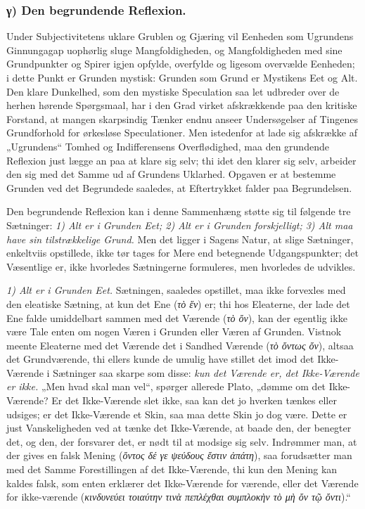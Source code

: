\documentclass[11pt]{book}
\newcommand{\opage}[1]{\marginnote{\footnotesize\textit{[#1]}}}
\begin{document}
\subsubsection*{γ) Den begrundende Reflexion.}

Under Subjectivitetens uklare Grublen og Gjæring vil
Eenheden som Ugrundens Ginnungagap uophørlig sluge
Mangfoldigheden, og Mangfoldigheden med sine Grundpunkter
og Spirer igjen opfylde, overfylde og ligesom overvælde
Eenheden; i dette Punkt er Grunden mystisk: Grunden som
Grund er Mystikens Eet og Alt. Den klare Dunkelhed, som
den mystiske Speculation saa let udbreder over de herhen
hørende Spørgsmaal, har i den Grad virket afskrækkende paa
den kritiske Forstand, at mangen skarpsindig Tænker endnu
anseer Undersøgelser af Tingenes Grundforhold for ørkesløse
Speculationer. Men istedenfor at lade sig afskrække af
„Ugrundens“ Tomhed og Indifferensens Overflødighed, maa
den grundende Reflexion just lægge an paa at klare sig selv;
thi idet den
\opage{93} \setcounter{footnote}{0}%
klarer sig selv, arbeider den sig med det Samme ud af
Grundens Uklarhed. Opgaven er at bestemme Grunden ved
det Begrundede saaledes, at Eftertrykket falder paa
Begrundelsen.

Den begrundende Reflexion kan i denne Sammenhæng støtte
sig til følgende tre Sætninger: \emph{1) Alt er i Grunden Eet;
2) Alt er i Grunden forskjelligt; 3) Alt maa have sin
tilstrækkelige Grund.} Men det ligger i Sagens Natur, at
slige Sætninger, enkeltviis opstillede, ikke tør tages for Mere
end betegnende Udgangspunkter; det Væsentlige er, ikke
hvorledes Sætningerne formuleres, men hvorledes de udvikles.

\emph{1) Alt er i Grunden Eet.} Sætningen, saaledes opstillet,
maa ikke forvexles med den eleatiske Sætning, at kun det Ene
(\textit{τὸ ἕν}) er; thi hos Eleaterne, der lade det Ene falde
umiddelbart sammen med det Værende (\textit{τὸ ὄν}), kan der
egentlig ikke være Tale enten om nogen Væren i Grunden eller
Væren af Grunden. Vistnok meente Eleaterne med det
Værende det i Sandhed Værende (\textit{τὸ ὄντως ὄν}), altsaa
det Grundværende, thi ellers kunde de umulig have stillet det
imod det Ikke-Værende i Sætninger saa skarpe som disse:
\emph{kun det Værende er, det Ikke-Værende er ikke.}
„Men hvad skal man vel“, spørger allerede Plato, „dømme om
det Ikke-Værende? Er det Ikke-Værende slet ikke, saa kan det
jo hverken tænkes eller udsiges; er det Ikke-Værende et Skin,
saa maa dette Skin jo dog være. Dette er just
Vanskeligheden ved at tænke det Ikke-Værende, at baade den,
der benegter det, og den, der forsvarer det, er nødt til at
modsige sig selv. Indrømmer man, at der gives en falsk
Mening (\textit{ὄντος δέ γε ψεύδους ἔστιν ἀπάτη}), saa
forudsætter man med det Samme Forestillingen af det
Ikke-Værende, thi kun den Mening kan kaldes falsk, som
enten erklærer det Ikke-Værende for værende, eller det
Værende for ikke-værende
\opage{94} \setcounter{footnote}{0}%
(\textit{κινδυνεύει τοιαύτην τινὰ πεπλέχθαι συμπλοκὴν τὸ μὴ
ὄν τῷ ὄντι}).“
\end{document}
